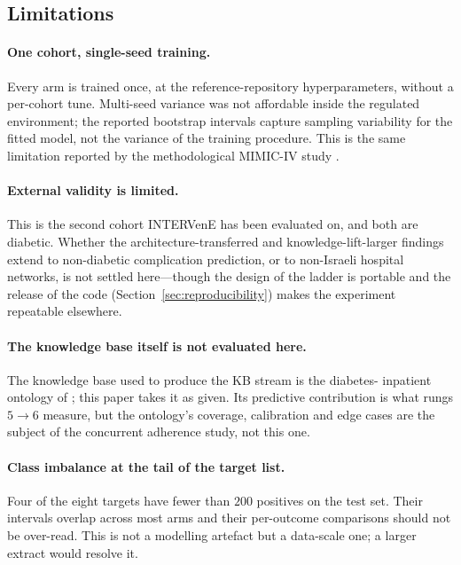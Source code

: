 \subsection{Limitations}
\label{sec:discussion-limits}

\paragraph{One cohort, single-seed training.}
Every arm is trained once, at the reference-repository hyperparameters,
without a per-cohort tune. Multi-seed variance was not affordable
inside the regulated environment; the reported bootstrap intervals
capture sampling variability for the fitted model, not the variance of
the training procedure. This is the same limitation reported by the
methodological MIMIC-IV study \citep{oded2026intervene}.

\paragraph{External validity is limited.}
This is the second cohort INTERVenE has been evaluated on, and both are
diabetic. Whether the architecture-transferred and knowledge-lift-larger
findings extend to non-diabetic complication prediction, or to
non-Israeli hospital networks, is not settled here---though the design
of the ladder is portable and the release of the code
(Section~\ref{sec:reproducibility}) makes the experiment repeatable
elsewhere.

\paragraph{The knowledge base itself is not evaluated here.}
The knowledge base used to produce the KB stream is the diabetes-
inpatient ontology of \citep{hochberg2023inpatient,oded2027kineret-jbi};
this paper takes it as given. Its predictive contribution is what rungs
$5 \to 6$ measure, but the ontology's coverage, calibration and edge
cases are the subject of the concurrent adherence study, not this one.

\paragraph{Class imbalance at the tail of the target list.}
Four of the eight targets have fewer than $200$ positives on the test
set. Their intervals overlap across most arms and their per-outcome
comparisons should not be over-read. This is not a modelling artefact
but a data-scale one; a larger extract would resolve it.

